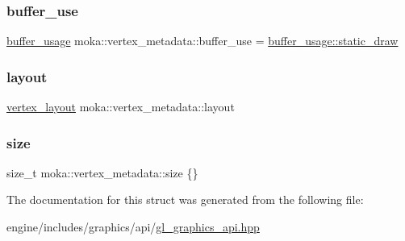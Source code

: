 \subsubsection{\texorpdfstring{buffer\_use}{buffer\_use}}
{\footnotesize\ttfamily \mbox{\hyperlink{namespacemoka_a4799e695da8b173f75809387af8abed7}{buffer\+\_\+usage}} moka\+::vertex\+\_\+metadata\+::buffer\+\_\+use = \mbox{\hyperlink{namespacemoka_a4799e695da8b173f75809387af8abed7a189a433f29705bbe60128483495ddfd9}{buffer\+\_\+usage\+::static\+\_\+draw}}}

\mbox{\label{structmoka_1_1vertex__metadata_a8c1902f88285695ee1f03423f6c7b418}} 
\subsubsection{\texorpdfstring{layout}{layout}}
{\footnotesize\ttfamily \mbox{\hyperlink{classmoka_1_1vertex__layout}{vertex\+\_\+layout}} moka\+::vertex\+\_\+metadata\+::layout}

\mbox{\label{structmoka_1_1vertex__metadata_a87f180c1e0e1164eb3854e0444570212}} 
\subsubsection{\texorpdfstring{size}{size}}
{\footnotesize\ttfamily size\+\_\+t moka\+::vertex\+\_\+metadata\+::size \{\}}



The documentation for this struct was generated from the following file\+:\begin{DoxyCompactItemize}
\item 
engine/includes/graphics/api/\mbox{\hyperlink{gl__graphics__api_8hpp}{gl\+\_\+graphics\+\_\+api.\+hpp}}\end{DoxyCompactItemize}
